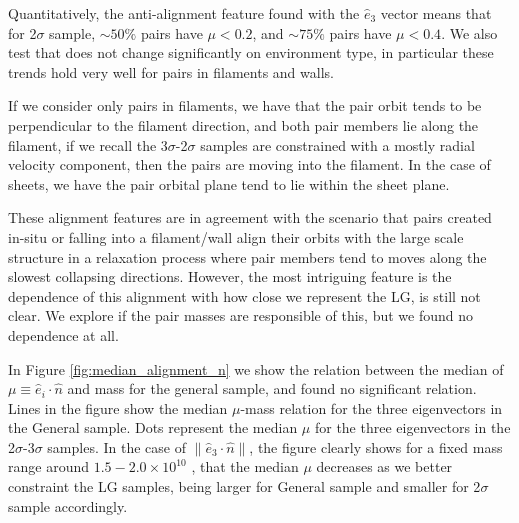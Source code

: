 \documentclass{emulateapj}
\newcommand{\msun}{{\ifmmode{{\rm {M_{\odot}}}}\else{${\rm{M_{\odot}}}$}\fi}}
\begin{document}
Quantitatively, the anti-alignment feature found with the $\hat{e}_3$ 
vector means that for 2$\sigma$ sample, $\sim 50\%$ pairs have $\mu<0.2$,
and $\sim 75\%$ pairs have $\mu<0.4$.
We also test that does not change significantly on environment type, in particular 
these trends hold very well for pairs in filaments and walls.

If we consider only pairs in filaments, we have that the pair orbit tends
to be perpendicular to the filament direction, and both pair members lie 
along the filament, if we recall the 3$\sigma$-2$\sigma$ samples are 
constrained with a mostly radial velocity component, then the pairs 
are moving into the filament.
In the case of sheets, we have the pair orbital plane  tend to lie within
 the sheet plane.

These alignment features are in agreement with the scenario that pairs 
created in-situ or falling into a filament/wall align their orbits with 
the large scale structure in a relaxation process where pair members
tend to moves along the slowest collapsing directions.
However, the most intriguing feature is the dependence of this alignment
with how close we represent the LG, is still not clear.
We explore if the pair masses are responsible of this, but we found 
no dependence at all.

In Figure \ref{fig:median_alignment_n} we show the relation between the median 
of $\mu\equiv\hat{e}_i\cdot\hat{n}$ and mass for the general sample, and found 
no significant relation.
Lines in the figure show the median $\mu$-mass relation for the three 
eigenvectors in the General sample.
Dots represent the median $\mu$ for the three eigenvectors in the 
2$\sigma$-3$\sigma$ samples.
In the case of $\|\hat{e}_3\cdot\hat{n}\|$, the figure clearly shows for a fixed mass
range around $1.5-2.0 \times 10^{10}$ \msun, that the median $\mu$ decreases as we
better constraint the LG samples, being larger for General sample and smaller for 
2$\sigma$ sample accordingly.



\end{document}
